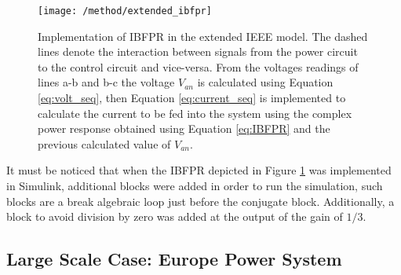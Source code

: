 \begin{figure}[h]
	\centering
	\texttt{[image: /method/extended\_ibfpr]}
	\caption{Implementation of IBFPR in the extended IEEE model. The dashed lines denote the interaction between signals from the power circuit to the control circuit and vice-versa. From the voltages readings of lines a-b and b-c the voltage $ V_{an} $ is calculated using Equation \eqref{eq:volt_seq}, then Equation \eqref{eq:current_seq} is implemented to calculate the current to be fed into the system using the complex power response obtained using Equation \eqref{eq:IBFPR} and the previous calculated value of $ V_{an} $.} 
	\label{fig:ieeeext_ibfpr}
\end{figure}

It must be noticed that when the IBFPR depicted in Figure \ref{fig:ieeeext_ibfpr} was implemented in Simulink, additional blocks were added in order to run the simulation, such blocks are a break algebraic loop just before the conjugate block. Additionally, a block to avoid division by zero was added at the output of the gain of $ 1 /3 $.

\subsection{Large Scale Case: Europe Power System}


